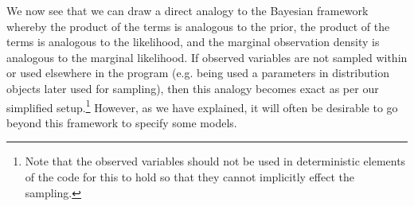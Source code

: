We now see that we can draw a direct analogy to the Bayesian framework whereby the product of the
\sample terms is analogous to the prior, the product of the \observe terms is analogous to the
likelihood, and the marginal observation density is analogous to the marginal likelihood.  If observed variables
are not sampled within or used elsewhere in the program (e.g. being used a parameters in distribution objects
later used for sampling), then this analogy becomes exact as per our simplified setup.\footnote{Note that the
	observed variables should not be used in deterministic elements of the code for this to hold so that they
	cannot implicitly effect the sampling.}  However, as we have explained, it will often be desirable to go
beyond this framework to specify some models.

